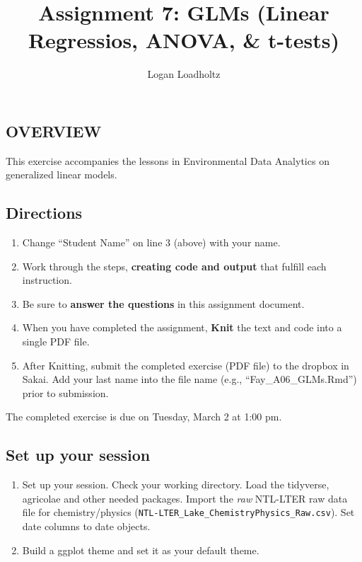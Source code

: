 \documentclass[
]{article}
\title{Assignment 7: GLMs (Linear Regressios, ANOVA, \& t-tests)}
\author{Logan Loadholtz}
\date{}
\providecommand{\tightlist}{%
  \setlength{\itemsep}{0pt}\setlength{\parskip}{0pt}}
\begin{document}
\maketitle

\hypertarget{overview}{%
\subsection{OVERVIEW}\label{overview}}

This exercise accompanies the lessons in Environmental Data Analytics on
generalized linear models.

\hypertarget{directions}{%
\subsection{Directions}\label{directions}}

\begin{enumerate}
\def\labelenumi{\arabic{enumi}.}
\tightlist
\item
  Change ``Student Name'' on line 3 (above) with your name.
\item
  Work through the steps, \textbf{creating code and output} that fulfill
  each instruction.
\item
  Be sure to \textbf{answer the questions} in this assignment document.
\item
  When you have completed the assignment, \textbf{Knit} the text and
  code into a single PDF file.
\item
  After Knitting, submit the completed exercise (PDF file) to the
  dropbox in Sakai. Add your last name into the file name (e.g.,
  ``Fay\_A06\_GLMs.Rmd'') prior to submission.
\end{enumerate}

The completed exercise is due on Tuesday, March 2 at 1:00 pm.

\hypertarget{set-up-your-session}{%
\subsection{Set up your session}\label{set-up-your-session}}

\begin{enumerate}
\def\labelenumi{\arabic{enumi}.}
\item
  Set up your session. Check your working directory. Load the tidyverse,
  agricolae and other needed packages. Import the \emph{raw} NTL-LTER
  raw data file for chemistry/physics
  (\texttt{NTL-LTER\_Lake\_ChemistryPhysics\_Raw.csv}). Set date columns
  to date objects.
\item
  Build a ggplot theme and set it as your default theme.
\end{enumerate}
\end{document}

